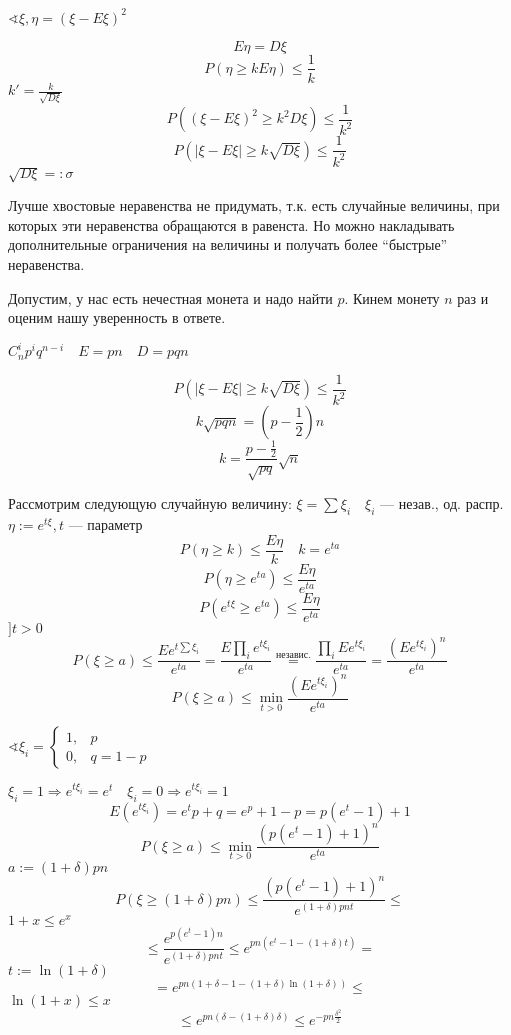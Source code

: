 $\sphericalangle \xi, \eta=(\xi-E\xi)^2$

$$E\eta=D\xi$$
$$P(\eta\geq kE\eta) \leq \frac{1}{k}$$
$k'=\frac{k}{\sqrt{D\xi}}$
$$P((\xi-E\xi)^2\geq k^2D\xi)\leq\frac{1}{k^2}$$
$$P(|\xi-E\xi|\geq k\sqrt{D\xi})\leq\frac{1}{k^2}$$
$\sqrt{D\xi}=:\sigma$

Лучше хвостовые неравенства не придумать, т.к. есть случайные величины, при которых эти неравенства обращаются в равенста. Но можно накладывать дополнительные ограничения на величины и получать более ``быстрые'' неравенства.

Допустим, у нас есть нечестная монета и надо найти $p$. Кинем монету $n$ раз и оценим нашу уверенность в ответе.

$C_n^ip^iq^{n-i} \quad E=pn \quad D = pqn$

$$P\left(|\xi - E\xi| \geq k\sqrt{D\xi}\right)\leq \frac{1}{k^2}$$
$$k\sqrt{pqn}=\left(p-\frac{1}{2}\right)n$$
$$k=\frac{p-\frac{1}{2}}{\sqrt{pq}}\sqrt{n}$$

Рассмотрим следующую случайную величину: $\xi=\sum\xi_i \quad \xi_i$ --- незав., од. распр.
$\eta:=e^{t\xi}, t$ --- параметр
$$P(\eta\geq k)\leq\frac{E\eta}{k} \quad k=e^{ta}$$
$$P(\eta\geq e^{ta})\leq\frac{E\eta}{e^{ta}}$$
$$P(e^{t\xi}\geq e^{ta})\leq\frac{E\eta}{e^{ta}}$$
$]t>0$
$$P(\xi\geq a)\leq \frac{Ee^{t\sum \xi_i}}{e^{ta}}=\frac{E\prod\limits_i e^{t\xi_i}}{e^{ta}}\stackrel{\text{независ.}}{=}\frac{\prod\limits_i Ee^{t\xi_i}}{e^{ta}}=\frac{\left(Ee^{t\xi_i}\right)^n}{e^{ta}}$$
$$P(\xi\geq a)\leq \min\limits_{t>0}\frac{\left(Ee^{t\xi_i}\right)^n}{e^{ta}}$$

$\sphericalangle \xi_i=\begin{cases}
    1, & p \\
    0, & q = 1 - p
\end{cases}$

$\xi_i=1\Rightarrow e^{t\xi_i}=e^t \quad \xi_i=0 \Rightarrow e^{t\xi_i}=1$
$$E(e^{t\xi_i})=e^tp+q=e^p+1-p=p(e^t-1)+1$$
$$P(\xi\geq a)\leq \min\limits_{t>0} \frac{(p(e^t-1)+1)^n}{e^{ta}}$$
$a:=(1+\delta)pn$
$$P(\xi\geq (1+\delta)pn) \leq \frac{(p(e^t-1)+1)^n}{e^{(1+\delta)pnt}}\leq$$
$1+x\leq e^x$
$$\leq\frac{e^{p(e^t-1)n}}{e^{(1+\delta)pnt}}\leq e^{pn(e^t-1-(1+\delta)t)}=$$
$t:=\ln(1+\delta)$
$$=e^{pn(1+\delta-1-(1+\delta)\ln(1+\delta))}\leq$$
$\ln(1+x)\leq x$
$$\leq e^{pn(\delta-(1+\delta)\delta)}\leq e^{-pn\frac{\delta^2}{2}}$$

